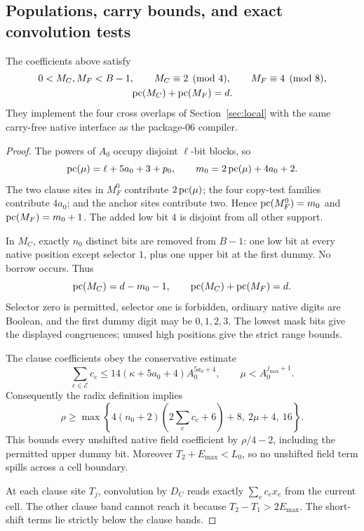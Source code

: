 \subsection{Populations, carry bounds, and exact convolution tests}

\begin{lemma}\label{lem:cross-interface}
The coefficients above satisfy
\begin{gather*}
 0<M_C,M_F<B-1,\qquad M_C\equiv2\pmod4,\qquad
 M_F\equiv4\pmod8,\\
 \operatorname{pc}(M_C)+\operatorname{pc}(M_F)=d.
\end{gather*}
They implement the four cross overlaps of
Section~\ref{sec:local} with the same carry-free native interface
as the package-06 compiler.
\end{lemma}

\begin{proof}
The powers of \(A_0\) occupy disjoint \(\ell\)-bit blocks, so
\[
 \operatorname{pc}(\mu)=\ell+5a_0+3+p_0,\qquad
 m_0=2\operatorname{pc}(\mu)+4a_0+2.
\]
The two clause sites in \(M_F^0\) contribute \(2\operatorname{pc}(\mu)\);
the four copy-test families contribute \(4a_0\); and the anchor
sites contribute two. Hence \(\operatorname{pc}(M_F^0)=m_0\) and
\(\operatorname{pc}(M_F)=m_0+1\). The added low bit \(4\) is disjoint from
all other support.

In \(M_C\), exactly \(n_0\) distinct bits are removed from \(B-1\):
one low bit at every native position except selector \(1\), plus
one upper bit at the first dummy. No borrow occurs. Thus
\[
 \operatorname{pc}(M_C)=d-m_0-1,\qquad
 \operatorname{pc}(M_C)+\operatorname{pc}(M_F)=d.
\]
Selector zero is permitted, selector one is forbidden, ordinary
native digits are Boolean, and the first dummy digit may be
\(0,1,2,3\). The lowest mask bits give the displayed congruences;
unused high positions give the strict range bounds.

The clause coefficients obey the conservative estimate
\[
 \sum_{e\in\mathcal E}c_e
       \le14(\kappa+5a_0+4)A_0^{5a_0+4},
 \qquad \mu<A_0^{j_{\max}+1}.
\]
Consequently the radix definition implies
\begin{equation}\label{eq:cross-carry}
 \rho\ge
 \max\left\{4(n_0+2)\left(2\sum_ec_e+6\right)+8,\
             2\mu+4,\ 16\right\}.
\end{equation}
This bounds every unshifted native field coefficient by
\(\rho/4-2\), including the permitted upper dummy bit.
Moreover \(T_2+E_{\max}<L_0\), so no unshifted field term
spills across a cell boundary.

At each clause site \(T_j\), convolution by \(D_C\) reads exactly
\(\sum_ec_ex_e\) from the current cell. The other clause band cannot
reach it because \(T_2-T_1>2E_{\max}\). The short-shift terms lie
strictly below the clause bands.


\end{proof}
